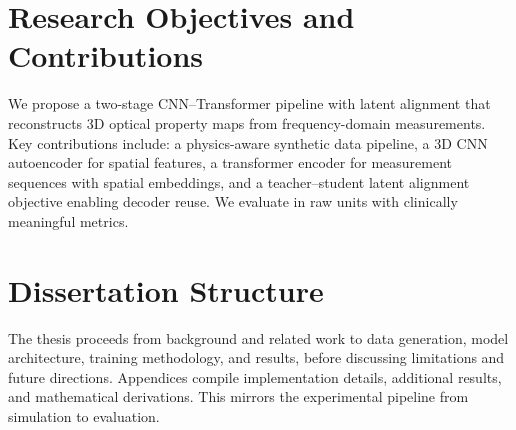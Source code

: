 \section{Research Objectives and Contributions}

We propose a two-stage CNN–Transformer pipeline with latent alignment that reconstructs 3D optical property maps from frequency-domain measurements. Key contributions include: a physics-aware synthetic data pipeline, a 3D CNN autoencoder for spatial features, a transformer encoder for measurement sequences with spatial embeddings, and a teacher–student latent alignment objective enabling decoder reuse. We evaluate in raw units with clinically meaningful metrics.

\section{Dissertation Structure}

The thesis proceeds from background and related work to data generation, model architecture, training methodology, and results, before discussing limitations and future directions. Appendices compile implementation details, additional results, and mathematical derivations. This mirrors the experimental pipeline from simulation to evaluation.

